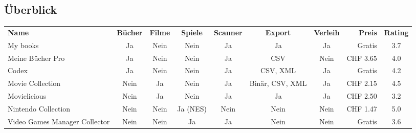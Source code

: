 \newpage

\begin{landscape}
	\section{Überblick}
	\label{sec:Ueberblick}
	\begin{tabular}{|l|c|c|c|c|c|c|r|c|}
		\rowcolor{black} 
		\color{white}\textbf{Name} & \color{white}\textbf{Bücher} & \color{white}\textbf{Filme} & \color{white}\textbf{Spiele} & \color{white}\textbf{Scanner} & \color{white}\textbf{Export} & \color{white}\textbf{Verleih} & \color{white}\textbf{Preis} & \color{white}\textbf{Rating} \\
		My books & Ja & \color{red}Nein & \color{red}Nein & Ja & Ja & Ja & Gratis & 3.7 \\ \hline
		\rowcolor{DarkSeaGreen} Meine Bücher Pro & Ja & \color{red}Nein & \color{red}Nein & Ja & CSV & \color{black}Nein & CHF 3.65 & 4.0 \\ \hline
		Codex & Ja & \color{red}Nein & \color{red}Nein & Ja & CSV, XML & Ja & Gratis & 4.2 \\ \hline
		\rowcolor{DarkSeaGreen} Movie Collection & \color{red}Nein & Ja & \color{red}Nein & Ja & Binär, CSV, XML & Ja & CHF 2.15 & 4.5 \\ \hline
		Movielicious & \color{red}Nein & Ja & \color{red}Nein & Ja & Ja & Ja & CHF 2.50 & 3.2 \\ \hline
		\rowcolor{DarkSeaGreen} Nintendo Collection & \color{red}Nein & \color{red}Nein & Ja (NES) & \color{red}Nein & \color{red}Nein & \color{red}Nein & CHF 1.47 & 5.0 \\ \hline
		Video Games Manager Collector &  \color{red}Nein & \color{red}Nein & Ja & Ja & Nein & Nein & Gratis & 3.6 \\ \hline
	\end{tabular} 
\end{landscape} 